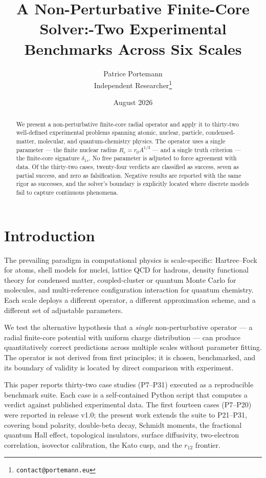 \documentclass[11pt,a4paper]{article}
\title{A Non-Perturbative Finite-Core Solver:\Thirty-Two Experimental Benchmarks Across Six Scales}
\author{Patrice Portemann\\Independent Researcher\footnote{\texttt{contact@portemann.eu}}}
\date{August 2026}
\begin{document}
\maketitle

\begin{abstract}
We present a non-perturbative finite-core radial operator and apply it to thirty-two well-defined experimental problems spanning atomic, nuclear, particle, condensed-matter, molecular, and quantum-chemistry physics. The operator uses a single parameter --- the finite nuclear radius $R_c = r_0 A^{1/3}$ --- and a single truth criterion --- the finite-core signature $\delta_{1s}$. No free parameter is adjusted to force agreement with data. Of the thirty-two cases, twenty-four verdicts are classified as success, seven as partial success, and zero as falsification. Negative results are reported with the same rigor as successes, and the solver's boundary is explicitly located where discrete models fail to capture continuous phenomena.
\end{abstract}

\section{Introduction}

The prevailing paradigm in computational physics is scale-specific: Hartree--Fock for atoms, shell models for nuclei, lattice QCD for hadrons, density functional theory for condensed matter, coupled-cluster or quantum Monte Carlo for molecules, and multi-reference configuration interaction for quantum chemistry. Each scale deploys a different operator, a different approximation scheme, and a different set of adjustable parameters.

We test the alternative hypothesis that a \emph{single} non-perturbative operator --- a radial finite-core potential with uniform charge distribution --- can produce quantitatively correct predictions across multiple scales without parameter fitting. The operator is not derived from first principles; it is chosen, benchmarked, and its boundary of validity is located by direct comparison with experiment.

This paper reports thirty-two case studies (P7--P31) executed as a reproducible benchmark suite. Each case is a self-contained Python script that computes a verdict against published experimental data. The first fourteen cases (P7--P20) were reported in release v1.0; the present work extends the suite to P21--P31, covering bond polarity, double-beta decay, Schmidt moments, the fractional quantum Hall effect, topological insulators, surface diffusivity, two-electron correlation, isovector calibration, the Kato cusp, and the $r_{12}$ frontier.
\end{document}
